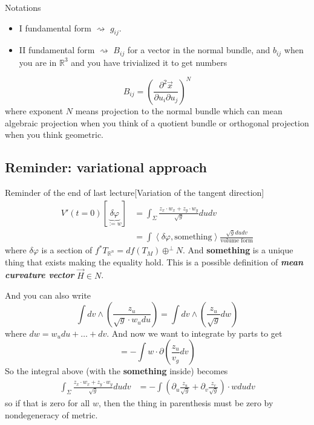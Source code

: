 \begin{thing8}{Notations}\leavevmode
\begin{itemize}
\item I fundamental form \(\rightsquigarrow \) \(g_{ij}\).
\item  II fundamental form \(\rightsquigarrow \) \(B_{ij}\) for a vector in the normal bundle, and \(b_{ij}\) when you are in \(\mathbb{R}^3\) and you have trivialized it to get numbers
\end{itemize}
\end{thing8}

\begin{claim}\leavevmode
\[B_{ij}=\left(\frac{\partial^2 \vec{x}}{\partial u_i\partial u_j}\right)^N \]
where exponent \(N\) means projection to the normal bundle which can mean algebraic projection when you think of a quotient bundle or orthogonal projection when you think geometric.
\end{claim}

\subsection{Reminder: variational approach}

\begin{thing6}{Reminder of the end of last lecture}[Variation of the tangent direction]\leavevmode
	\begin{align*}V'(t=0)[\underbrace{\delta \varphi}_{:=w}]&= \int_{\Sigma}\frac{z_x\cdot w_x+z_y\cdot w_y}{\sqrt{g} }dudv\\
		&=\int \left<\delta \varphi,\text{something} \right>\frac{\sqrt{g} dudv}{\text{volume form} }
	\end{align*}
where \(\delta \varphi\) is a section of \(f^* T_{\mathbb{R}^n}=df(T_M) \oplus^\perp N\). And \textbf{something} is a unique thing that exists making the equality hold. This is a possible definition of \textit{\textbf{mean curvature vector}} \(\vec{H} \in N\).

And you can also write
\[\int dv \wedge \left(\frac{z_u}{\sqrt{g} \cdot w_u du}\right) = \int dv \wedge \left(\frac{z_u}{\sqrt{g} }dw\right) \]
where \(dw=w_u du+\ldots+dv\). And now we want to integrate by parts to get
\[=-\int w \cdot \partial\left(\frac{z_u}{v_g}dv\right) \]
So the integral above (with the \textbf{something} inside) becomes
\begin{align*}
\int_{\Sigma}\frac{z_x\cdot w_x+z_y\cdot w_y}{\sqrt{g} }dudv&=-\int \left(\partial_u \frac{z_u}{\sqrt{g}}+\partial_v \frac{z_v}{\sqrt{g}}  \right)\cdot w du dv
\end{align*}
so if that is zero for all \(w\), then the thing in parenthesis must be zero by nondegeneracy of metric.
\end{thing6}

